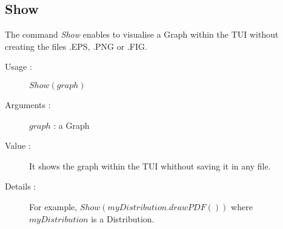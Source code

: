 \subsection{Show}

The command {\itshape Show} enables to visualise a Graph within the TUI without creating the files .EPS, .PNG or .FIG.
\begin{description}
\item[Usage :] $Show(graph)$

\item[Arguments :] $graph$ : a Graph

\item[Value :] It shows the graph within the TUI whithout saving it in any file.
\item[Details :] For example, $Show(myDistribution.drawPDF())$ where $myDistribution$ is a Distribution.
\end{description}
